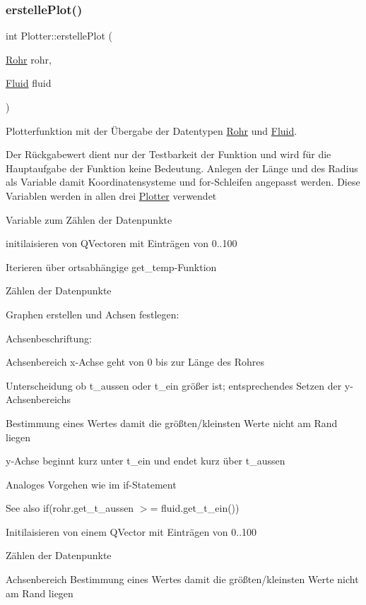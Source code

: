 \subsubsection{\texorpdfstring{erstelle\+Plot()}{erstellePlot()}}
{\footnotesize\ttfamily int Plotter\+::erstelle\+Plot (\begin{DoxyParamCaption}\item[{\hyperlink{class_rohr}{Rohr}}]{rohr,  }\item[{\hyperlink{class_fluid}{Fluid}}]{fluid }\end{DoxyParamCaption})}



Plotterfunktion mit der Übergabe der Datentypen \hyperlink{class_rohr}{Rohr} und \hyperlink{class_fluid}{Fluid}. 

Der Rückgabewert dient nur der Testbarkeit der Funktion und wird für die Hauptaufgabe der Funktion keine Bedeutung. Anlegen der Länge und des Radius als Variable damit Koordinatensysteme und for-\/\+Schleifen angepasst werden. Diese Variablen werden in allen drei \hyperlink{class_plotter}{Plotter} verwendet

Variable zum Zählen der Datenpunkte

initilaisieren von Q\+Vectoren mit Einträgen von 0..100

Iterieren über ortsabhängige get\+\_\+temp-\/\+Funktion

Zählen der Datenpunkte

Graphen erstellen und Achsen festlegen\+:

Achsenbeschriftung\+:

Achsenbereich x-\/\+Achse geht von 0 bis zur Länge des Rohres

Unterscheidung ob t\+\_\+aussen oder t\+\_\+ein größer ist; entsprechendes Setzen der y-\/\+Achsenbereichs

Bestimmung eines Wertes damit die größten/kleinsten Werte nicht am Rand liegen

y-\/\+Achse beginnt kurz unter t\+\_\+ein und endet kurz über t\+\_\+aussen

Analoges Vorgehen wie im if-\/\+Statement \begin{DoxySeeAlso}{See also}
if(rohr.\+get\+\_\+t\+\_\+aussen $>$= fluid.\+get\+\_\+t\+\_\+ein())
\end{DoxySeeAlso}
Initilaisieren von einem Q\+Vector mit Einträgen von 0..100

Zählen der Datenpunkte

Achsenbereich Bestimmung eines Wertes damit die größten/kleinsten Werte nicht am Rand liegen

